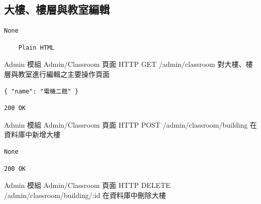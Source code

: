 \documentclass{article}
\begin{document}
\pagebreak

\subsection{大樓、樓層與教室編輯}

\begin{lrbox}{\jsoninputbox}
	\begin{lstlisting}
None
\end{lstlisting}
\end{lrbox}

\begin{lrbox}{\jsonoutputbox}
	\begin{lstlisting}
	Plain HTML
\end{lstlisting}
\end{lrbox}

{Admin 模組}
{Admin/Classroom 頁面}
{HTTP GET}
{/admin/classroom}
{對大樓、樓層與教室進行編輯之主要操作頁面}

\bigskip

\begin{lrbox}{\jsoninputbox}
	\begin{lstlisting}[basicstyle=\footnotesize\ttfamily]
{ "name": "電機二館" }
\end{lstlisting}
\end{lrbox}

\begin{lrbox}{\jsonoutputbox}
	\begin{lstlisting}
200 OK
\end{lstlisting}
\end{lrbox}

{Admin 模組}
{Admin/Classroom 頁面}
{HTTP POST}
{/admin/classroom/building}
{在資料庫中新增大樓}

\bigskip

\begin{lrbox}{\jsoninputbox}
	\begin{lstlisting}
None
\end{lstlisting}
\end{lrbox}

\begin{lrbox}{\jsonoutputbox}
	\begin{lstlisting}
200 OK
\end{lstlisting}
\end{lrbox}

{Admin 模組}
{Admin/Classroom 頁面}
{HTTP DELETE}
{/admin/classroom/building/:id}
{在資料庫中刪除大樓}
\end{document}
